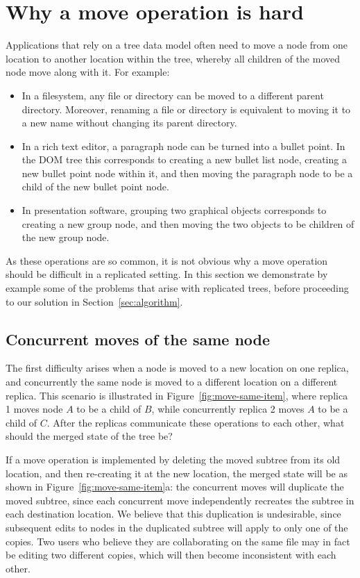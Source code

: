 \documentclass[sigconf]{acmart}
\begin{document}
\section{Why a move operation is hard}\label{sec:move-is-hard}

Applications that rely on a tree data model often need to move a node from one location to another location within the tree, whereby all children of the moved node move along with it.
For example:
\begin{itemize}
    \item In a filesystem, any file or directory can be moved to a different parent directory.
        Moreover, renaming a file or directory is equivalent to moving it to a new name without changing its parent directory.
    \item In a rich text editor, a paragraph node can be turned into a bullet point.
        In the DOM tree this corresponds to creating a new bullet list node, creating a new bullet point node within it, and then moving the paragraph node to be a child of the new bullet point node.
    \item In presentation software, grouping two graphical objects corresponds to creating a new group node, and then moving the two objects to be children of the new group node.
\end{itemize}
As these operations are so common, it is not obvious why a move operation should be difficult in a replicated setting.
In this section we demonstrate by example some of the problems that arise with replicated trees, before proceeding to our solution in Section~\ref{sec:algorithm}.

\subsection{Concurrent moves of the same node}\label{sec:move-same-item}

The first difficulty arises when a node is moved to a new location on one replica, and concurrently the same node is moved to a different location on a different replica.
This scenario is illustrated in Figure~\ref{fig:move-same-item}, where replica 1 moves node $A$ to be a child of $B$, while concurrently replica 2 moves $A$ to be a child of $C$.
After the replicas communicate these operations to each other, what should the merged state of the tree be?

If a move operation is implemented by deleting the moved subtree from its old location, and then re-creating it at the new location, the merged state will be as shown in Figure~\ref{fig:move-same-item}a: the concurrent moves will duplicate the moved subtree, since each concurrent move independently recreates the subtree in each destination location.
We believe that this duplication is undesirable, since subsequent edits to nodes in the duplicated subtree will apply to only one of the copies.
Two users who believe they are collaborating on the same file may in fact be editing two different copies, which will then become inconsistent with each other.
\end{document}
